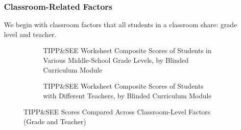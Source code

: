 \documentclass[sigconf,manuscript,review,anonymous]{acmart} %
\def\ts{TIPP\&SEE}
\newcommand{\Scratchencore}[0]{Blinded Curriculum}
\begin{document}
\subsubsection{Classroom-Related Factors} 
We begin with classroom factors that all students in a classroom share: grade level and teacher.


\begin{figure}
     \centering
    \begin{subfigure}[t]{0.49\textwidth}
        \caption{\ts{} Worksheet Composite Scores of Students in Various Middle-School Grade Levels, by \Scratchencore{} Module}
        \label{fig:grade_factors}
    \end{subfigure}
    \hfill
    \begin{subfigure}[t]{0.49\textwidth}
        \caption{\ts{} Worksheet Composite Scores of Students with Different Teachers, by \Scratchencore{} Module}
        \label{fig:teacher_factors}
    \end{subfigure}
    \caption{\ts{} Scores Compared Across Classroom-Level Factors (Grade and Teacher)}
    \label{fig:classroom_factors}
\end{figure}
\end{document}
